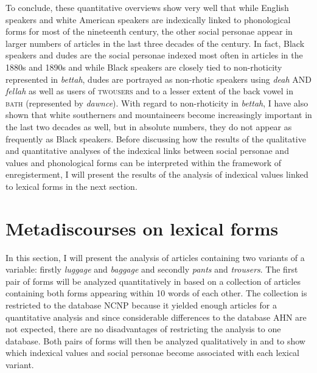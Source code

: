 To conclude, these quantitative overviews show very well that while English speakers and white American speakers are indexically linked to phonological forms for most of the nineteenth century, the other social personae appear in larger numbers of articles in the last three decades of the century. In fact, Black speakers and dudes are the social personae indexed most often in articles in the 1880s and 1890s and while Black speakers are closely tied to non-rhoticity represented in \emph{bettah}, dudes are portrayed as non-rhotic speakers using \emph{deah} AND \emph{fellah} as well as users of \textsc{twousers} and to a lesser extent of the back vowel in \textsc{bath} (represented by \emph{dawnce}). With regard to non-rhoticity in \emph{bettah}, I have also shown that white southerners and mountaineers become increasingly important in the last two decades as well, but in absolute numbers, they do not appear as frequently as Black speakers. Before discussing how the results of the qualitative and quantitative analyses of the indexical links between social personae and values and phonological forms can be interpreted within the framework of enregisterment, I will present the results of the analysis of indexical values linked to lexical forms in the next section.


\section{Metadiscourses on lexical forms}
\label{bkm:Ref11924664}\hypertarget{Toc63021241}{}
In this section, I will present the analysis of articles containing two variants of a variable: firstly \emph{luggage} and \emph{baggage} and secondly \emph{pants} and \emph{trousers}. The first pair of forms will be analyzed quantitatively in  based on a collection of articles containing both forms appearing within 10 words of each other. The collection is restricted to the database NCNP because it yielded enough articles for a quantitative analysis and since considerable differences to the database AHN are not expected, there are no disadvantages of restricting the analysis to one database. Both pairs of forms will then be analyzed qualitatively in  and  to show which indexical values and social personae become associated with each lexical variant.


